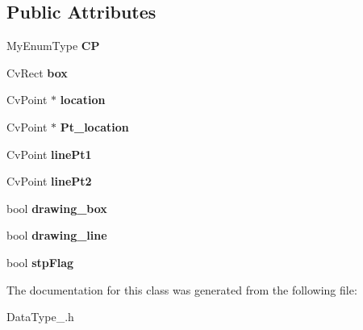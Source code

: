\subsection*{Public Attributes}
\begin{DoxyCompactItemize}
\item 
\hypertarget{class_globalvariable_a15fc743efeae8d4d152e64270b1dbdff}{My\-Enum\-Type {\bfseries C\-P}}\label{class_globalvariable_a15fc743efeae8d4d152e64270b1dbdff}

\item 
\hypertarget{class_globalvariable_a4c09d0b64b9957cf01d31141377d7db8}{Cv\-Rect {\bfseries box}}\label{class_globalvariable_a4c09d0b64b9957cf01d31141377d7db8}

\item 
\hypertarget{class_globalvariable_a67d3b2e9de9ebc8a4771fd94270b40a8}{Cv\-Point $\ast$ {\bfseries location}}\label{class_globalvariable_a67d3b2e9de9ebc8a4771fd94270b40a8}

\item 
\hypertarget{class_globalvariable_a87ab6a73687f89394bf92ab593cade8a}{Cv\-Point $\ast$ {\bfseries Pt\-\_\-location}}\label{class_globalvariable_a87ab6a73687f89394bf92ab593cade8a}

\item 
\hypertarget{class_globalvariable_a178a751295d4822f72e830f9546b7dd0}{Cv\-Point {\bfseries line\-Pt1}}\label{class_globalvariable_a178a751295d4822f72e830f9546b7dd0}

\item 
\hypertarget{class_globalvariable_a30d2af8a33ed928f69fa1ff0fa2ddfc4}{Cv\-Point {\bfseries line\-Pt2}}\label{class_globalvariable_a30d2af8a33ed928f69fa1ff0fa2ddfc4}

\item 
\hypertarget{class_globalvariable_a4124b3a26e5e31d9eb84d5a694e39c22}{bool {\bfseries drawing\-\_\-box}}\label{class_globalvariable_a4124b3a26e5e31d9eb84d5a694e39c22}

\item 
\hypertarget{class_globalvariable_af2fbe1d72e0ca72903b44ab11912b8a1}{bool {\bfseries drawing\-\_\-line}}\label{class_globalvariable_af2fbe1d72e0ca72903b44ab11912b8a1}

\item 
\hypertarget{class_globalvariable_a060969a7d2a5c66a37083f964e0999de}{bool {\bfseries stp\-Flag}}\label{class_globalvariable_a060969a7d2a5c66a37083f964e0999de}

\end{DoxyCompactItemize}


The documentation for this class was generated from the following file\-:\begin{DoxyCompactItemize}
\item 
Data\-Type\-\_\-.\-h\end{DoxyCompactItemize}
